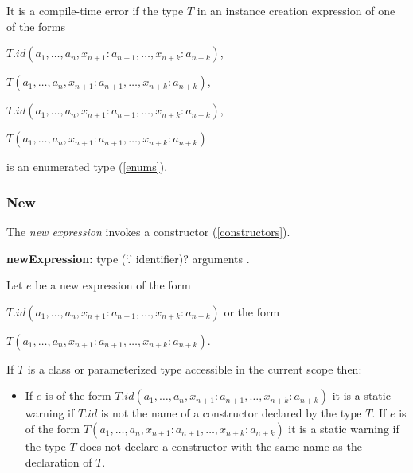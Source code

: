 \documentclass{article}
\begin{document}
\LMHash{}
It is a compile-time error if the type $T$ in an instance creation expression of one of the forms

\NEW{} $T.id(a_1, \ldots , a_n, x_{n+1}: a_{n+1}, \ldots , x_{n+k}: a_{n+k})$,

\NEW{} $T(a_1, \ldots , a_n, x_{n+1}: a_{n+1}, \ldots , x_{n+k}: a_{n+k})$,

\CONST{} $T.id(a_1, \ldots , a_n, x_{n+1}: a_{n+1}, \ldots , x_{n+k}: a_{n+k})$,

\CONST{} $T(a_1, \ldots , a_n, x_{n+1}: a_{n+1}, \ldots , x_{n+k}: a_{n+k})$

is an enumerated type (\ref{enums}).


\subsubsection{New}

\LMHash{}
The {\em new expression} invokes a constructor (\ref{constructors}).

\begin{grammar}
{\bf newExpression:}\NEW{} type (`{\escapegrammar .}' identifier)? arguments
  .
\end{grammar}

\LMHash{}
Let $e$ be a new expression of the form

\NEW{} $T.id(a_1, \ldots , a_n, x_{n+1}: a_{n+1}, \ldots , x_{n+k}: a_{n+k})$ or the form

\NEW{} $T(a_1, \ldots , a_n, x_{n+1}: a_{n+1}, \ldots , x_{n+k}: a_{n+k})$.



\LMHash{}
If $T$ is a class or parameterized type accessible in the current scope then:
\begin{itemize}
\item
If $e$ is of the form \NEW{} $T.id(a_1, \ldots , a_n, x_{n+1}: a_{n+1}, \ldots , x_{n+k}: a_{n+k})$ it is a static warning if $T.id$ is not the name of a constructor declared by the type $T$.
If $e$ is of the form \NEW{} $T(a_1, \ldots , a_n, x_{n+1}: a_{n+1}, \ldots , x_{n+k}: a_{n+k})$ it is a static warning if the type $T$ does not declare a constructor with the same name as the declaration of $T$.
\end{itemize}
\end{document}
